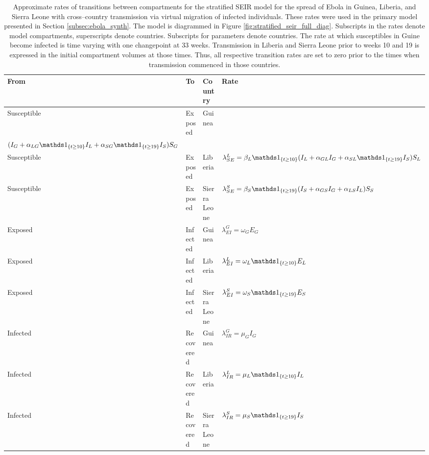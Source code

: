 \begin{table}
	\caption[Transmission rates for the stratified SEIR model with virtual migration of infecteds for Ebola in West Africa.]{Approximate rates of transitions between compartments for the stratified SEIR model for the spread of Ebola in Guinea, Liberia, and Sierra Leone with cross--country transmission via virtual migration of infected individuals. These rates were used in the primary model presented in Section \ref{subsec:ebola_synth}. The model is diagrammed in Figure \ref{fig:stratified_seir_full_diag}. Subscripts in the rates denote model compartments, superscripts denote countries. Subscripts for parameters denote countries. The rate at which susceptibles in Guine become infected is time varying with one changepoint at 33 weeks. Transmission in Liberia and Sierra Leone prior to weeks 10 and 19 is expressed in the initial compartment volumes at those times. Thus, all respective transition rates are set to zero prior to the times when transmission commenced in those countries.}
	\label{tab:ebola_synth_rates_approx}
	\centering\footnotesize
	\begin{tabular}{llll}
		\hline
		\textbf{From} & \textbf{To} & \textbf{Country} & \textbf{Rate} \\
		\hline
		Susceptible & Exposed & Guinea & \hspace{-0.7in}\makecell{$ \lambda_{SE}^G(t) = (\beta_G^{(1)} \ind{t<33} + \beta_G^{(2)}\ind{t\geq33})\times $\\
		\hspace{1.25in}$ (I_G + \alpha_{LG}\ind{t\geq10}I_L + \alpha_{SG}\ind{t\geq19}I_S)S_G $} \\
		Susceptible & Exposed & Liberia & $ \lambda_{SE}^L = \beta_L\ind{t\geq10}(I_L + \alpha_{GL}I_G + \alpha_{SL}\ind{t\geq19}I_S)S_L $\\
		Susceptible & Exposed & Sierra Leone & $ \lambda_{SE}^S = \beta_S\ind{t\geq19}(I_S + \alpha_{GS}I_G + \alpha_{LS}I_L)S_S $ \\
		Exposed & Infected & Guinea & $ \lambda_{EI}^G = \omega_GE_G $\\
		Exposed & Infected & Liberia & $ \lambda_{EI}^L = \omega_L\ind{t\geq10}E_L $ \\
		Exposed & Infected & Sierra Leone & $\lambda_{EI}^S = \omega_S\ind{t\geq19}E_S$ \\
		Infected & Recovered & Guinea & $ \lambda_{IR}^G = \mu_GI_G $ \\
		Infected & Recovered & Liberia & $ \lambda_{IR}^L = \mu_L\ind{t\geq10}I_L $ \\	
		Infected & Recovered & Sierra Leone & $ \lambda_{IR}^S = \mu_S\ind{t\geq19}I_S $ \\
		\hline
	\end{tabular}
\end{table}


